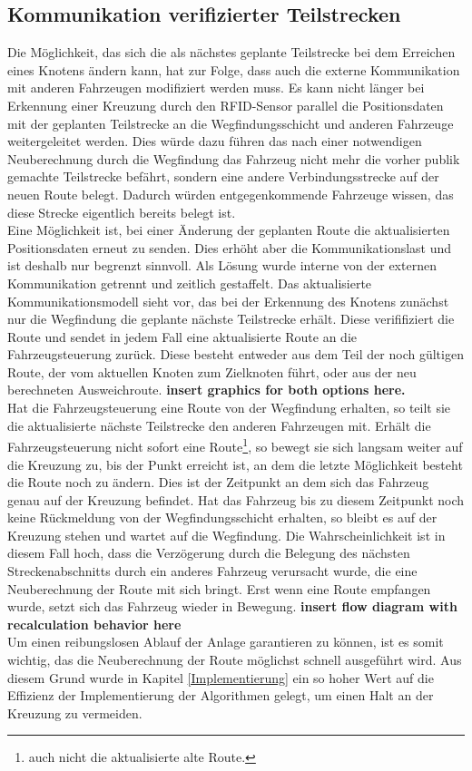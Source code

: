 	\subsection{Kommunikation verifizierter Teilstrecken}
		\label{Anpassung Kommunikation}
		Die Möglichkeit, das sich die als nächstes geplante Teilstrecke bei dem Erreichen eines Knotens ändern kann, hat zur Folge, dass auch die externe Kommunikation mit anderen Fahrzeugen modifiziert werden muss. Es kann nicht länger bei Erkennung einer Kreuzung durch den \ac{RFID}-Sensor parallel die Positionsdaten mit der geplanten Teilstrecke an die Wegfindungsschicht und anderen Fahrzeuge weitergeleitet werden. Dies würde dazu führen das nach einer notwendigen Neuberechnung durch die Wegfindung das Fahrzeug nicht mehr die vorher publik gemachte Teilstrecke befährt, sondern eine andere Verbindungsstrecke auf der neuen Route belegt. Dadurch würden entgegenkommende Fahrzeuge wissen, das diese Strecke eigentlich bereits belegt ist.
		\\
		Eine Möglichkeit ist, bei einer Änderung der geplanten Route die aktualisierten Positionsdaten erneut zu senden. Dies erhöht aber die Kommunikationslast und ist deshalb nur begrenzt sinnvoll. Als Lösung wurde interne von der externen Kommunikation getrennt und zeitlich gestaffelt. Das aktualisierte Kommunikationsmodell sieht vor, das bei der Erkennung des Knotens zunächst nur die Wegfindung die geplante nächste Teilstrecke erhält. Diese verififiziert die Route und sendet in jedem Fall eine aktualisierte Route an die Fahrzeugsteuerung zurück. Diese besteht entweder aus dem Teil der noch gültigen Route, der vom aktuellen Knoten zum Zielknoten führt, oder aus der neu berechneten Ausweichroute. \textbf{insert graphics for both options here.}
		\\
		Hat die Fahrzeugsteuerung eine Route von der Wegfindung erhalten, so teilt sie die aktualisierte nächste Teilstrecke den anderen Fahrzeugen mit. Erhält die Fahrzeugsteuerung nicht sofort eine Route\footnote{auch nicht die aktualisierte alte Route.}, so bewegt sie sich langsam weiter auf die Kreuzung zu, bis der Punkt erreicht ist, an dem die letzte Möglichkeit besteht die Route noch zu ändern. Dies ist der Zeitpunkt an dem sich das Fahrzeug genau auf der Kreuzung befindet. Hat das Fahrzeug bis zu diesem Zeitpunkt noch keine Rückmeldung von der Wegfindungsschicht erhalten, so bleibt es auf der Kreuzung stehen und wartet auf die Wegfindung. Die Wahrscheinlichkeit ist in diesem Fall hoch, dass die Verzögerung durch die Belegung des nächsten Streckenabschnitts durch ein anderes Fahrzeug verursacht wurde, die eine Neuberechnung der Route mit sich bringt. Erst wenn eine Route empfangen wurde, setzt sich das Fahrzeug wieder in Bewegung. \textbf{insert flow diagram with recalculation behavior here}
		\\
		Um einen reibungslosen Ablauf der Anlage garantieren zu können, ist es somit wichtig, das die Neuberechnung der Route möglichst schnell ausgeführt wird. Aus diesem Grund wurde in Kapitel \ref{Implementierung} ein so hoher Wert auf die Effizienz der Implementierung der Algorithmen gelegt, um einen Halt an der Kreuzung zu vermeiden.   
